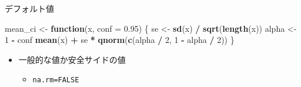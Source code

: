\documentclass[ignorenonframetext,]{beamer}
\newenvironment{Shaded}{\begin{snugshade}}{\end{snugshade}}
\newcommand{\KeywordTok}[1]{\textcolor[rgb]{0.13,0.29,0.53}{\textbf{#1}}}
\newcommand{\DataTypeTok}[1]{\textcolor[rgb]{0.13,0.29,0.53}{#1}}
\newcommand{\DecValTok}[1]{\textcolor[rgb]{0.00,0.00,0.81}{#1}}
\newcommand{\FloatTok}[1]{\textcolor[rgb]{0.00,0.00,0.81}{#1}}
\newcommand{\StringTok}[1]{\textcolor[rgb]{0.31,0.60,0.02}{#1}}
\newcommand{\ControlFlowTok}[1]{\textcolor[rgb]{0.13,0.29,0.53}{\textbf{#1}}}
\newcommand{\OperatorTok}[1]{\textcolor[rgb]{0.81,0.36,0.00}{\textbf{#1}}}
\newcommand{\NormalTok}[1]{#1}
\providecommand{\tightlist}{%
  \setlength{\itemsep}{0pt}\setlength{\parskip}{0pt}}
\begin{document}
\begin{frame}[fragile]{デフォルト値}

\begin{Shaded}
\begin{Highlighting}[]
\NormalTok{mean_ci <-}\StringTok{ }\ControlFlowTok{function}\NormalTok{(x, }\DataTypeTok{conf =} \FloatTok{0.95}\NormalTok{) \{}
\NormalTok{    se <-}\StringTok{ }\KeywordTok{sd}\NormalTok{(x) }\OperatorTok{/}\StringTok{ }\KeywordTok{sqrt}\NormalTok{(}\KeywordTok{length}\NormalTok{(x))}
\NormalTok{  alpha <-}\StringTok{ }\DecValTok{1} \OperatorTok{-}\StringTok{ }\NormalTok{conf}
    \KeywordTok{mean}\NormalTok{(x) }\OperatorTok{+}\StringTok{ }\NormalTok{se }\OperatorTok{*}\StringTok{ }\KeywordTok{qnorm}\NormalTok{(}\KeywordTok{c}\NormalTok{(alpha }\OperatorTok{/}\StringTok{ }\DecValTok{2}\NormalTok{, }\DecValTok{1} \OperatorTok{-}\StringTok{ }\NormalTok{alpha }\OperatorTok{/}\StringTok{ }\DecValTok{2}\NormalTok{))}
\NormalTok{\}}
\end{Highlighting}
\end{Shaded}

\begin{itemize}
\tightlist
\item
  一般的な値か安全サイドの値

  \begin{itemize}
  \tightlist
  \item
    \texttt{na.rm=FALSE}
  \end{itemize}
\end{itemize}

\end{frame}
\end{document}
